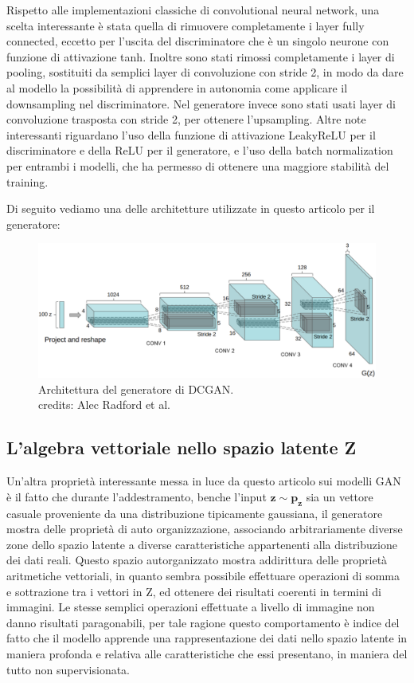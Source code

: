 Rispetto alle implementazioni classiche di convolutional neural network, una scelta interessante è stata quella di rimuovere completamente 
i layer fully connected, eccetto per l'uscita del discriminatore che è un singolo neurone con funzione di attivazione tanh.
Inoltre sono stati rimossi completamente i layer di pooling, sostituiti da semplici layer di convoluzione con stride 2, in modo da dare al modello
la possibilità di apprendere in autonomia come applicare il downsampling nel discriminatore. Nel generatore invece sono stati usati layer di
convoluzione trasposta con stride 2, per ottenere l'upsampling.
Altre note interessanti riguardano l'uso della funzione di attivazione LeakyReLU per il discriminatore e della ReLU per il generatore, e l'uso
della batch normalization per entrambi i modelli, che ha permesso di ottenere una maggiore stabilità del training.

Di seguito vediamo una delle architetture utilizzate in questo articolo per il generatore:

    \begin{figure}[H]
        \centering
        \includegraphics[width=1.0\textwidth]{imgs/DCGAN_generator.png}
        \caption{Architettura del generatore di DCGAN.\\
        credits: Alec Radford et al. \cite{radford2016unsupervised}}
        \label{fig:DCGAN_generator}
    \end{figure}

\subsection{L'algebra vettoriale nello spazio latente Z}
Un'altra proprietà interessante messa in luce da questo articolo sui modelli GAN è il fatto che durante l'addestramento, benche l'input 
$\mathbf{z} \sim \mathbf{p_{z}}$ sia un vettore casuale proveniente da una distribuzione tipicamente gaussiana, il generatore
mostra delle proprietà di auto organizzazione, associando arbitrariamente diverse zone dello spazio latente a diverse caratteristiche 
appartenenti alla distribuzione dei dati reali.
Questo spazio autorganizzato mostra addirittura delle proprietà aritmetiche vettoriali, in quanto sembra possibile effettuare 
operazioni di somma e sottrazione tra i vettori in Z, ed ottenere dei risultati coerenti in termini di immagini. Le stesse semplici operazioni 
effettuate a livello di immagine non danno risultati paragonabili, per tale ragione questo comportamento è indice del fatto che il modello
apprende una rappresentazione dei dati nello spazio latente in maniera profonda e relativa alle caratteristiche che essi presentano, in 
maniera del tutto non supervisionata.

